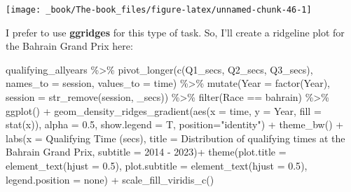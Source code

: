 \documentclass[
]{book}
\newenvironment{Shaded}{\begin{snugshade}}{\end{snugshade}}
\newcommand{\AttributeTok}[1]{\textcolor[rgb]{0.77,0.63,0.00}{#1}}
\newcommand{\FloatTok}[1]{\textcolor[rgb]{0.00,0.00,0.81}{#1}}
\newcommand{\FunctionTok}[1]{\textcolor[rgb]{0.00,0.00,0.00}{#1}}
\newcommand{\NormalTok}[1]{#1}
\newcommand{\SpecialCharTok}[1]{\textcolor[rgb]{0.00,0.00,0.00}{#1}}
\newcommand{\StringTok}[1]{\textcolor[rgb]{0.31,0.60,0.02}{#1}}
\begin{document}
\begin{center}\texttt{[image: \_book/The-book\_files/figure-latex/unnamed-chunk-46-1]} \end{center}

I prefer to use \textbf{ggridges} for this type of task. So, I'll create a ridgeline plot for the Bahrain Grand Prix here:

\begin{Shaded}
\begin{Highlighting}[]
\NormalTok{qualifying\_allyears }\SpecialCharTok{\%\textgreater{}\%}
  \FunctionTok{pivot\_longer}\NormalTok{(}\FunctionTok{c}\NormalTok{(}\StringTok{\textquotesingle{}Q1\_secs\textquotesingle{}}\NormalTok{, }\StringTok{\textquotesingle{}Q2\_secs\textquotesingle{}}\NormalTok{, }\StringTok{\textquotesingle{}Q3\_secs\textquotesingle{}}\NormalTok{),}
               \AttributeTok{names\_to =} \StringTok{\textquotesingle{}session\textquotesingle{}}\NormalTok{,}
               \AttributeTok{values\_to =} \StringTok{\textquotesingle{}time\textquotesingle{}}\NormalTok{) }\SpecialCharTok{\%\textgreater{}\%}
  \FunctionTok{mutate}\NormalTok{(}\AttributeTok{Year =} \FunctionTok{factor}\NormalTok{(Year),}
         \AttributeTok{session =} \FunctionTok{str\_remove}\NormalTok{(session, }\StringTok{\textquotesingle{}\_secs\textquotesingle{}}\NormalTok{)) }\SpecialCharTok{\%\textgreater{}\%}
  \FunctionTok{filter}\NormalTok{(Race }\SpecialCharTok{==} \StringTok{\textquotesingle{}bahrain\textquotesingle{}}\NormalTok{) }\SpecialCharTok{\%\textgreater{}\%}
  \FunctionTok{ggplot}\NormalTok{() }\SpecialCharTok{+}
  \FunctionTok{geom\_density\_ridges\_gradient}\NormalTok{(}\FunctionTok{aes}\NormalTok{(}\AttributeTok{x =}\NormalTok{ time, }\AttributeTok{y =}\NormalTok{ Year, }\AttributeTok{fill =} \FunctionTok{stat}\NormalTok{(x)),}
                 \AttributeTok{alpha =} \FloatTok{0.5}\NormalTok{, }\AttributeTok{show.legend =}\NormalTok{ T,}
                 \AttributeTok{position=}\StringTok{"identity"}\NormalTok{) }\SpecialCharTok{+}
  \FunctionTok{theme\_bw}\NormalTok{() }\SpecialCharTok{+}
  \FunctionTok{labs}\NormalTok{(}\AttributeTok{x =} \StringTok{\textquotesingle{}Qualifying Time (secs)\textquotesingle{}}\NormalTok{,}
       \AttributeTok{title =} \StringTok{\textquotesingle{}Distribution of qualifying times at the Bahrain Grand Prix\textquotesingle{}}\NormalTok{,}
       \AttributeTok{subtitle =} \StringTok{\textquotesingle{}2014 {-} 2023\textquotesingle{}}\NormalTok{)}\SpecialCharTok{+}
  \FunctionTok{theme}\NormalTok{(}\AttributeTok{plot.title =} \FunctionTok{element\_text}\NormalTok{(}\AttributeTok{hjust =} \FloatTok{0.5}\NormalTok{),}
        \AttributeTok{plot.subtitle =} \FunctionTok{element\_text}\NormalTok{(}\AttributeTok{hjust =} \FloatTok{0.5}\NormalTok{),}
        \AttributeTok{legend.position =} \StringTok{\textquotesingle{}none\textquotesingle{}}\NormalTok{) }\SpecialCharTok{+}
  \FunctionTok{scale\_fill\_viridis\_c}\NormalTok{()}
\end{Highlighting}
\end{Shaded}
\end{document}
